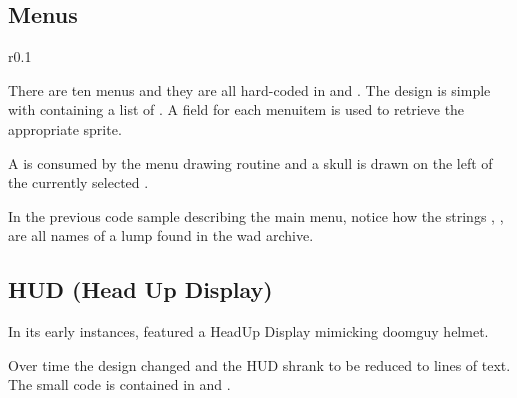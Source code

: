 \subsection{Menus}

\begin{wrapfigure}[5]{r}{0.1\textwidth}
\centering
{}
\end{wrapfigure}
There are ten menus and they are all hard-coded in  and . The design is simple with  containing a list of . A  field for each menuitem is used to retrieve the appropriate sprite.\\
\par


\par
A  is consumed by the menu drawing routine and a skull is drawn on the left of the currently selected .\\
\par
\begin{minipage}{0.55\textwidth}
\end{minipage}
\begin{minipage}{0.45\textwidth}
\centering
{}
\end{minipage}
\par
{}
\par
In the previous code sample describing the main menu, notice how the strings , ,  are all names of a lump found in the wad archive.\\
\par








\subsection{HUD (Head Up Display)}
In its early instances, \doom{}featured a HeadUp Display mimicking doomguy helmet.\\
\par
{}
\par
Over time the design changed and the HUD shrank to be reduced to lines of text. The small code is contained in  and .\\
\par
{}\\
\par




